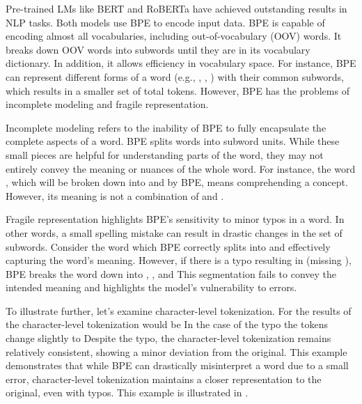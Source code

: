 Pre-trained LMs like BERT and RoBERTa have achieved outstanding results in NLP tasks. Both models use BPE to encode input data. BPE is capable of encoding almost all vocabularies, including out-of-vocabulary (OOV) words. It breaks down OOV words into subwords until they are in its vocabulary dictionary. In addition, it allows efficiency in vocabulary space. For instance, BPE can represent different forms of a word (e.g., , , ) with their common subwords, which results in a smaller set of total tokens. However, BPE has the problems of incomplete modeling and fragile representation.

Incomplete modeling refers to the inability of BPE to fully encapsulate the complete aspects of a word. BPE splits words into subword units. While these small pieces are helpful for understanding parts of the word, they may not entirely convey the meaning or nuances of the whole word. For instance, the word , which will be broken down into  and  by BPE, means comprehending a concept. However, its meaning is not a combination of  and .

Fragile representation highlights BPE's sensitivity to minor typos in a word. In other words, a small spelling mistake can result in drastic changes in the set of subwords. Consider the word  which BPE correctly splits into  and  effectively capturing the word's meaning. However, if there is a typo resulting in  (missing ), BPE breaks the word down into , , and  This segmentation fails to convey the intended meaning and highlights the model's vulnerability to errors.

To illustrate further, let's examine character-level tokenization. For  the results of the character-level tokenization would be         In the case of the typo  the tokens change slightly to        Despite the typo, the character-level tokenization remains relatively consistent, showing a minor deviation from the original. This example demonstrates that while BPE can drastically misinterpret a word due to a small error, character-level tokenization maintains a closer representation to the original, even with typos. This example is illustrated in .


